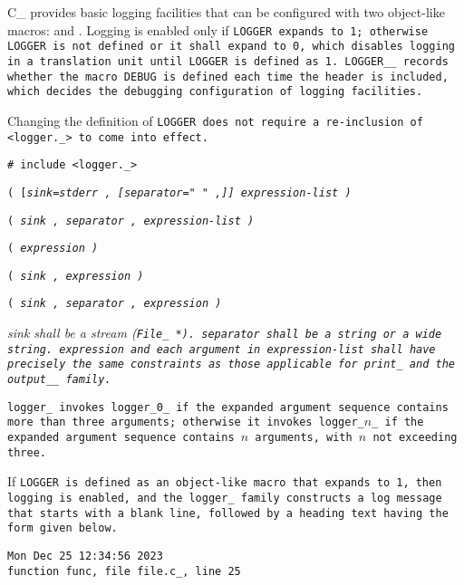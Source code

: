 C\_ provides basic logging facilities that can be configured
with two object-like macros:  and .
Logging is enabled only if \tt{LOGGER} expands to \tt{1};
otherwise \tt{LOGGER} is not defined or it shall expand to \tt{0}, which
disables logging in a translation unit until \tt{LOGGER} is defined as \tt{1}.
\tt{LOGGER__} records whether the macro \tt{DEBUG} is
defined each time the header  is included,
which decides the debugging configuration of logging facilities.

\note Changing the definition of \tt{LOGGER} does not require
a re-inclusion of \tt{<logger._>} to come into effect.


\tt{# include <logger._>}

\s\s\s\tt{(} [\it{sink}\tt{=stderr} \tt{,}
[\it{separator}\tt{=" "} \tt{,}]] \it{expression-list} \tt{)}

\s\tt{(} \it{sink} \tt{,}
\it{separator} \tt{,} \it{expression-list} \tt{)}

\s\tt{(} \it{expression} \tt{)}

\s\tt{(} \it{sink} \tt{,} \it{expression} \tt{)}

\s\tt{(} \it{sink} \tt{,} \it{separator} \tt{,} \it{expression} \tt{)}


\it{sink} shall be a stream (\tt{File_ *}).
\it{separator} shall be a string or a wide string.
\it{expression} and each argument in \it{expression-list} shall have precisely the
same constraints as those applicable for \tt{print_} and the \tt{output__} family.


\tt{logger_} invokes \tt{logger_0_} if the expanded argument sequence contains
more than three arguments; otherwise it invokes \tt{logger_}$n$\tt{_} if the
expanded argument sequence contains $n$ arguments, with $n$ not exceeding three.

If \tt{LOGGER} is defined as an object-like macro that expands to \tt{1}, then
logging is enabled, and the \tt{logger_} family constructs a log message that
starts with a blank line, followed by a heading text having the form given below.

\tt{Mon Dec 25 12:34:56 2023}\\
\tt{function func, file file.c_, line 25}\\
\elbat


